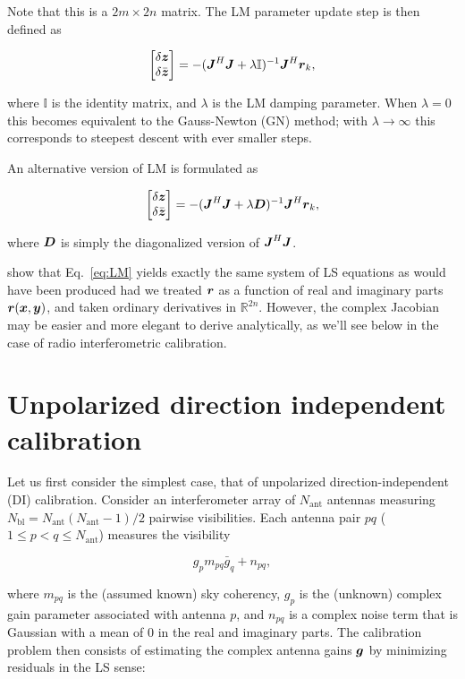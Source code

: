 \documentclass[useAMS,usenatbib]{mn2e}
\newcommand{\REAL}{\mathbb{R}}
\newcommand{\II}{\mathbb{I}}
\newcommand{\zz}{\bmath{z}}
\newcommand{\mat}[1]{{\bmath{#1}}}
\newcommand{\JJ}{\mat{J}} %
\newcommand{\DD}{\mat{D}}
\begin{document}
Note that this is a $2m \times 2n$ matrix. The LM parameter update step is then defined as

\begin{equation}
\label{eq:LM}
\Matrix{c}{\delta \zz \\ \delta \bar{\zz}} = -(\JJ^H \JJ + \lambda\II)^{-1}\JJ^H \bmath{r}_k,
\end{equation}

where $\II$ is the identity matrix, and $\lambda$ is the LM damping parameter. When $\lambda=0$ this becomes 
equivalent to the Gauss-Newton (GN) method; with $\lambda\to\infty$ this corresponds to steepest descent with ever smaller steps.

An alternative version of LM is formulated as

\begin{equation}
\label{eq:LM1}
\Matrix{c}{\delta \zz \\ \delta \bar{\zz}} = -(\JJ^H \JJ + \lambda \DD)^{-1}\JJ^H \bmath{r}_k,
\end{equation}

where $\DD$ is simply the diagonalized version of $\JJ^H\JJ$.

\citet{ComplexOpt} show that Eq.~\ref{eq:LM} yields exactly the same system of LS equations as would have 
been produced had we treated $\bmath{r}$ as a function of real and imaginary parts $\bmath{r}(\bmath{x},\bmath{y})$, 
and taken ordinary derivatives in $\REAL^{2n}$. However, the complex Jacobian may be easier and more elegant 
to derive analytically, as we'll see below in the case of radio interferometric calibration.

\section{Unpolarized direction independent calibration}

\newcommand{\Na}{N_\mathrm{ant}}
\newcommand{\Nbl}{N_\mathrm{bl}}
\newcommand{\Nd}{N_\mathrm{dir}}

Let us first consider the simplest case, that of unpolarized direction-independent (DI) calibration. Consider an interferometer
array of $\Na$ antennas measuring $\Nbl=\Na(\Na-1)/2$ pairwise visibilities. Each antenna pair $pq$ ($1\leq p<q\leq \Na$) 
measures the visibility

\begin{equation}
\label{eq:RIME:unpol}
g_p m_{pq} \bar{g}_q + n_{pq},
\end{equation}

where $m_{pq}$ is the (assumed known) sky coherency, $g_p$ is the (unknown) complex gain parameter 
associated with antenna $p$, and $n_{pq}$ is a complex noise term that is Gaussian with a mean of 0 in the real and 
imaginary parts. The calibration problem then consists of estimating the complex antenna gains $\bmath{g}$ by
minimizing residuals in the LS sense:
\end{document}
